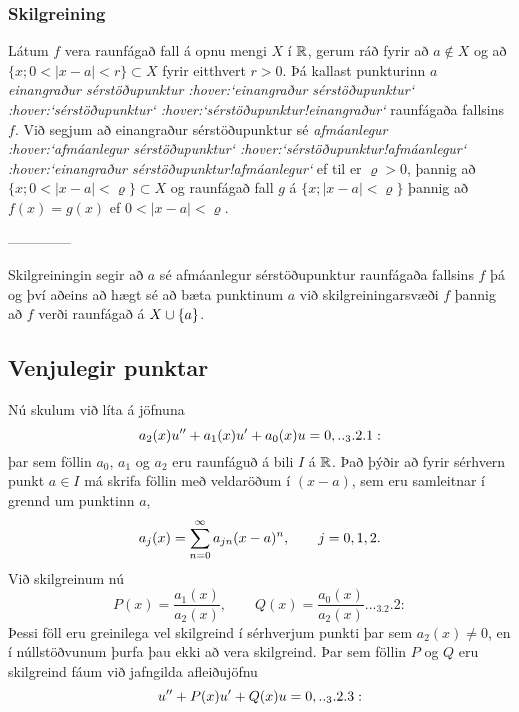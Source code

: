 \subsubsection{Skilgreining}
Látum $f$ vera raunfágað fall á opnu mengi  $X$ í ${\mathbb R}$, gerum ráð
fyrir að $a\not\in X$ og  að $\{x; 0<|x-a|<r\}\subset X$ fyrir
eitthvert $r>0$.  Þá kallast punkturinn $a$ {\it einangraður
sérstöðupunktur :hover:`einangraður
sérstöðupunktur` :hover:`sérstöðupunktur` :hover:`sérstöðupunktur!einangraður`} 
raunfágaða fallsins $f$.  Við segjum að einangraður
sérstöðupunktur sé {\it afmáanlegur :hover:`afmáanlegur
sérstöðupunktur` :hover:`sérstöðupunktur!afmáanlegur` :hover:`einangraður
sérstöðupunktur!afmáanlegur`} ef til er $\varrho>0$, þannig að
$\{x; 0<|x-a|<{\varrho}\}\subset X$ og raunfágað fall
$g$ á $\{x; |x-a|<{\varrho}\}$ 
þannig að  $f(x)=g(x)$ ef $0<|x-a|<{\varrho}$.


--------------




Skilgreiningin segir að $a$ sé afmáanlegur sérstöðupunktur 
raunfágaða fallsins $f$ þá og því aðeins að 
hægt sé að bæta punktinum $a$ við skilgreiningarsvæði $f$ þannig að $f$
verði raunfágað á $X\cup {\{a\}}$.


\subsection*{Venjulegir punktar}

Nú skulum við líta á jöfnuna 
 \begin{equation*}a_2(x)u\ddash+a_1(x)u\dash+a_0(x)u=0,

.. _3.2.1:

 \end{equation*}
þar sem föllin $a_0$, $a_1$ og $a_2$ eru raunfáguð á bili $I$ á ${\mathbb R}$.
Það þýðir að fyrir sérhvern punkt $a\in I$ má skrifa föllin með
veldaröðum í $(x-a)$,  sem eru samleitnar í grennd um punktinn $a$,
 $$a_j(x)=\sum_{n=0}\sp \infty a_{jn}(x-a)\sp n, \qquad j=0,1,2.
 $$
Við skilgreinum nú  
 \begin{equation*}P(x)=\dfrac{a_1(x)}{a_2(x)}, \qquad 
Q(x)=\dfrac{a_0(x)}{a_2(x)}.

.. _3.2.2:

 \end{equation*}
Þessi föll eru greinilega vel skilgreind í sérhverjum punkti þar sem
$a_2(x)\neq 0$, en í núllstöðvunum þurfa þau ekki að vera skilgreind.
Þar sem föllin $P$ og $Q$ eru skilgreind fáum við jafngilda
afleiðujöfnu
 \begin{equation*}u\ddash+P(x)u\dash+Q(x)u=0,

.. _3.2.3:

 \end{equation*}

